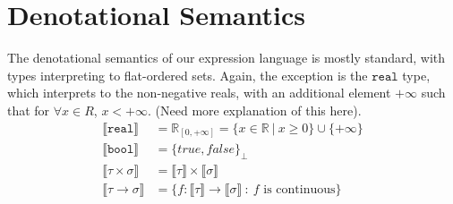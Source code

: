 \documentclass{westhesis}
\theoremstyle{plain}
\theoremstyle{definition}
\newcommand{\R}{\mathbb{R}}
\begin{document}
\section{Denotational Semantics}
The denotational semantics of our expression language is mostly standard, with types interpreting to flat-ordered sets. Again, 
the exception is the $\texttt{real}$ type, which interprets to the non-negative reals, with an additional element $+\infty$ such 
that for $\forall x \in R$, $x<+\infty$. (Need more explanation of this here).
 \begin{align*}
\llbracket \texttt{real} \rrbracket &= \R_{[0, +\infty]} = \{x \in \R \ | \ x \geq 0\} \cup \{+\infty\} \\
 \llbracket \texttt{bool} \rrbracket &= {\{true, false\}}_{\perp} \\
 \llbracket \tau \times \sigma \rrbracket &= \llbracket \tau \rrbracket \times \llbracket \sigma \rrbracket  \\
 \llbracket \tau \rightarrow \sigma \rrbracket &= \{f: \llbracket \tau \rrbracket \rightarrow \llbracket \sigma \rrbracket \ : 
 \ f \text{ is continuous}\}
 \end{align*}
\end{document}

